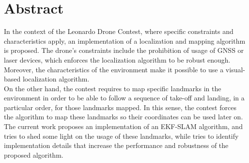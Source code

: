 
\begingroup
\let\clearpage\relax
\let\cleardoublepage\relax
\let\cleardoublepage\relax
{}
{}

\chapter*{Abstract}

In the context of the Leonardo Drone Contest, where specific constraints and characteristics apply, an implementation of a localization and mapping algorithm is proposed. The drone's constraints include the prohibition of usage of GNSS or laser devices, which enforces the localization algorithm to be robust enough. Moreover, the characteristics of the environment make it possible to use a visual-based localization algorithm. \\

On the other hand, the contest requires to map specific landmarks in the environment in order to be able to follow a sequence of take-off and landing, in a particular order, for those landmarks mapped. In this sense, the contest forces the algorithm to map these landmarks so their coordinates can be used later on.\\

The current work proposes an implementation of an EKF-SLAM algorithm, and tries to shed some light on the usage of these landmarks, while tries to identify implementation details that increase the performance and robustness of the proposed algorithm.

\vfill
\newpage
{}
